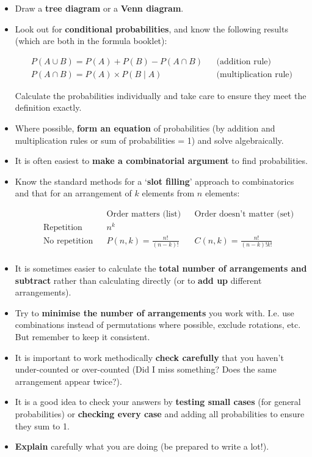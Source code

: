 \documentclass[9pt]{extarticle}
\begin{document}
	\begin{itemize}
		\item Draw a \textbf{tree diagram} or a \textbf{Venn diagram}.
		\item Look out for \textbf{conditional probabilities}, and know the following results (which are both in the formula booklet):
		
		\begin{align*}
		P(A \cup B) = P(A) + P(B) - P(A \cap B) && \text{(addition rule)} \\
		P(A \cap B) = P(A) \times P(B \mid A) && \text{(multiplication rule)}
		\end{align*}
		
		Calculate the probabilities individually and take care to ensure they meet the definition exactly.
		\item Where possible, \textbf{form an equation} of probabilities (by addition and multiplication rules or sum of probabilities = 1) and solve algebraically.
		\item It is often easiest to \textbf{make a combinatorial argument} to find probabilities.
		\item Know the standard methods for a `\textbf{slot filling}' approach to combinatorics and that for an arrangement of $k$ elements from $n$ elements:
		
		\begin{align*}
			&&							&&	\text{Order matters (list)} 	&& 	\text{Order doesn't matter (set)} 		\\
			&&	\text{Repetition} 		&& 	n^k 							&& 	\\
			&&	\text{No repetition} 	&& 	P(n,k) = \frac{n!}{(n-k)!} 		&& 	C(n,k) = \frac{n!}{(n-k)! k!} 			\\
		\end{align*}
		
		\item It is sometimes easier to calculate the \textbf{total number of arrangements and subtract} rather than calculating directly (or to \textbf{add up} different arrangements).
		\item Try to \textbf{minimise the number of arrangements} you work with. I.e. use combinations instead of permutations where possible, exclude rotations, etc. But remember to keep it consistent.
		\item It is important to work methodically \textbf{check carefully} that you haven't under-counted or over-counted (Did I miss something? Does the same arrangement appear twice?).
		\item It is a good idea to check your answers by \textbf{testing small cases} (for general probabilities) or \textbf{checking every case} and adding all probabilities to ensure they sum to 1.
		\item \textbf{Explain} carefully what you are doing (be prepared to write a lot!).
	\end{itemize}
	
\end{document}
